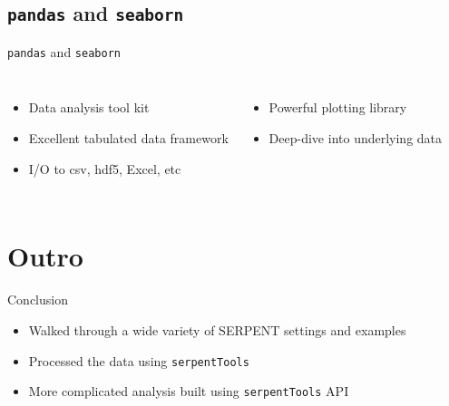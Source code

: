 \documentclass{beamer}
\newcommand{\st}{\texttt{serpentTools} }
\begin{document}
\subsection{\texttt{pandas} and \texttt{seaborn}}
\begin{frame}{\texttt{pandas} and \texttt{seaborn}}
    \begin{columns}
        \begin{itemize}
            \item{Data analysis tool kit}
            \item{Excellent tabulated data framework}
            \item{I/O to csv, hdf5, Excel, etc}
        \end{itemize}

        \begin{itemize}
            \item{Powerful plotting library}
            \item{Deep-dive into underlying data}
        \end{itemize}
    \end{columns}
\end{frame}


\section*{Outro}

\begin{frame}{Conclusion}
    \begin{itemize}
        \item Walked through a wide variety of SERPENT settings and examples
        \item Processed the data using \st
        \item More complicated analysis built using \st API
    \end{itemize}
\end{frame}
\end{document}
